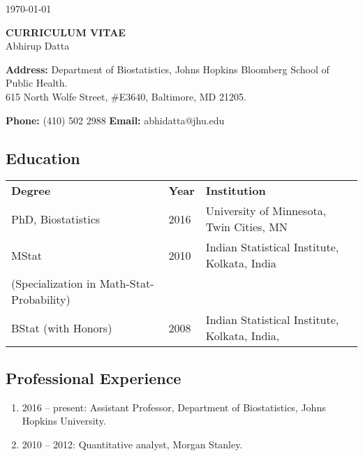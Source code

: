 \documentclass[12pt]{article}
\newcommand{\mydot}[1]{\begin{enumerate}[label=$\circ$,leftmargin=\parindent]\setlength{\itemsep}{#1}}
\newcommand{\ee}{\end{enumerate}}
\newcommand{\mylift}[1]{\vspace*{#1}}
\begin{document}
\hfill \today

\begin{center}
{\bf CURRICULUM VITAE}\\
Abhirup Datta\\[3mm]
\end{center}



\textbf{Address:} Department of Biostatistics, Johns Hopkins Bloomberg School of Public Health.\\[0.2em]
615 North Wolfe Street, \#E3640, Baltimore, MD 21205.

\textbf{Phone:} (410) 502 2988  
\hfill \textbf{Email:} abhidatta@jhu.edu 
\mylift{-1.5em}
\subsection*{Education}



\mylift{-.5em}\begin{tabular}{lll}
\textbf{Degree} & \textbf{Year} & \textbf{Institution}\\
PhD, Biostatistics & 2016 & University of Minnesota, Twin Cities, MN\\
MStat & 2010 & Indian Statistical Institute, Kolkata, India\\
(Specialization in Math-Stat-Probability) & &  \\
BStat (with Honors) & 2008 & Indian Statistical Institute, Kolkata, India,
\end{tabular}


\mylift{-1.em}

\subsection*{Professional Experience}
\mydot{-0.1em}
\item \vskip -3mm
2016 -- present: Assistant Professor, Department of Biostatistics, Johns Hopkins University.
\item 2010 -- 2012: Quantitative analyst, Morgan Stanley.
\ee
\mylift{-2.5em}
\end{document}
